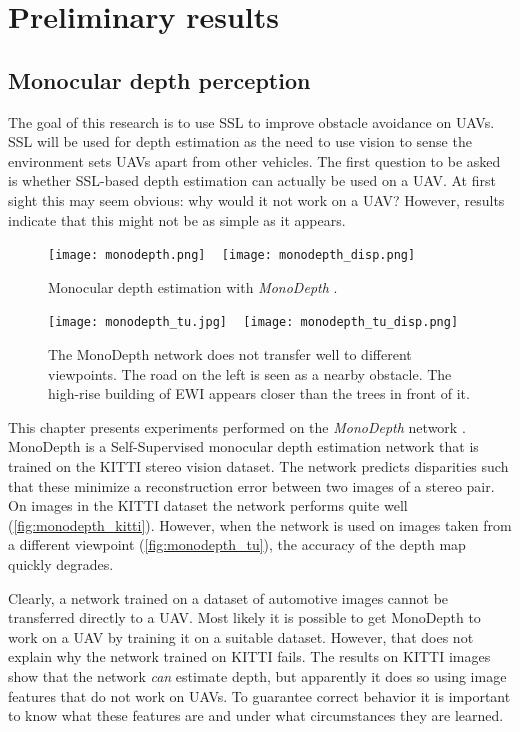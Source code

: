 \chapter{Preliminary results}
\label{sec:preliminary}
\section{Monocular depth perception}
\label{sec:prelim_monocular}
The goal of this research is to use \ac{SSL} to improve obstacle avoidance on \acp{UAV}.
\ac{SSL} will be used for depth estimation as the need to use vision to sense the environment sets \acp{UAV} apart from other vehicles.
The first question to be asked is whether \ac{SSL}-based depth estimation can actually be used on a \ac{UAV}.
At first sight this may seem obvious: why would it not work on a \ac{UAV}?
However, results indicate that this might not be as simple as it appears.

\begin{figure}
\centering
\texttt{[image: monodepth.png]}
~
\texttt{[image: monodepth\_disp.png]}
\caption{Monocular depth estimation with \emph{MonoDepth} \cite{Godard2017}.}
\label{fig:monodepth_kitti}
\end{figure}

\begin{figure}
\centering
\texttt{[image: monodepth\_tu.jpg]}
~
\texttt{[image: monodepth\_tu\_disp.png]}
\caption{The MonoDepth network does not transfer well to different viewpoints. The road on the left is seen as a nearby obstacle. The high-rise building of EWI appears closer than the trees in front of it.}
\label{fig:monodepth_tu}
\end{figure}

This chapter presents experiments performed on the \emph{MonoDepth} network \cite{Godard2017}.
MonoDepth is a Self-Supervised monocular depth estimation network that is trained on the KITTI stereo vision dataset.
The network predicts disparities such that these minimize a reconstruction error between two images of a stereo pair.
On images in the KITTI dataset the network performs quite well (\autoref{fig:monodepth_kitti}).
However, when the network is used on images taken from a different viewpoint (\autoref{fig:monodepth_tu}), the accuracy of the depth map quickly degrades.

Clearly, a network trained on a dataset of automotive images cannot be transferred directly to a \ac{UAV}.
Most likely it is possible to get MonoDepth to work on a \ac{UAV} by training it on a suitable dataset.
However, that does not explain why the network trained on KITTI fails.
The results on KITTI images show that the network \emph{can} estimate depth, but apparently it does so using image features that do not work on \acp{UAV}.
To guarantee correct behavior it is important to know what these features are and under what circumstances they are learned.

